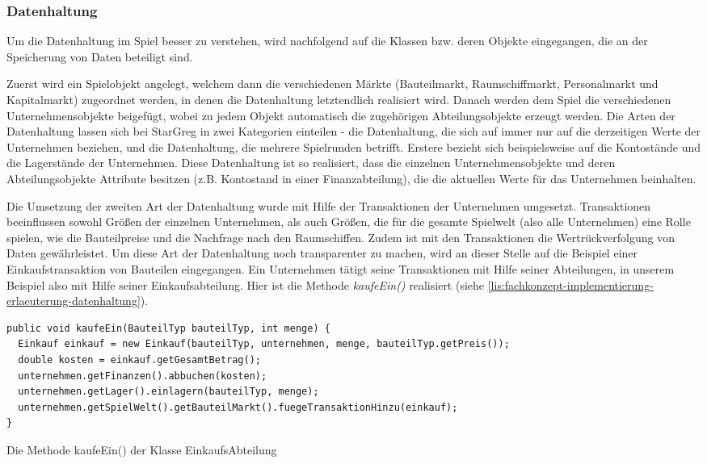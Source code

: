 \subsubsection{Datenhaltung}
\label{subsub:fachkonzept-implementierung-erlaeuterung-datenhaltung}

Um die Datenhaltung im Spiel besser zu verstehen, wird nachfolgend auf die Klassen bzw. deren Objekte eingegangen, die an der Speicherung von Daten beteiligt sind.

Zuerst wird ein Spielobjekt angelegt, welchem dann die verschiedenen Märkte (Bauteilmarkt, Raumschiffmarkt, Personalmarkt und Kapitalmarkt) zugeordnet werden, in denen die Datenhaltung letztendlich realisiert wird. Danach werden dem Spiel die verschiedenen Unternehmensobjekte beigefügt, wobei zu jedem Objekt automatisch die zugehörigen Abteilungsobjekte erzeugt werden. Die Arten der Datenhaltung lassen sich bei StarGreg in zwei Kategorien einteilen - die Datenhaltung, die sich auf immer nur auf die derzeitigen Werte der Unternehmen beziehen, und die Datenhaltung, die mehrere Spielrunden betrifft. Erstere bezieht sich beispielsweise auf die Kontostände und die Lagerstände der Unternehmen. Diese Datenhaltung ist so realisiert, dass die einzelnen Unternehmensobjekte und deren Abteilungsobjekte Attribute besitzen (z.B. Kontostand in einer Finanzabteilung), die die aktuellen Werte für das Unternehmen beinhalten.

Die Umsetzung der zweiten Art der Datenhaltung wurde mit Hilfe der Transaktionen der Unternehmen umgesetzt. Transaktionen beeinflussen sowohl Größen der einzelnen Unternehmen, als auch Größen, die für die gesamte Spielwelt (also alle Unternehmen) eine Rolle spielen, wie die Bauteilpreise und die Nachfrage nach den Raumschiffen. Zudem ist mit den Transaktionen die Wertrückverfolgung von Daten gewährleistet. Um diese Art der Datenhaltung noch transparenter zu machen, wird an dieser Stelle auf die Beispiel einer Einkaufstransaktion von Bauteilen eingegangen. Ein Unternehmen tätigt seine Transaktionen mit Hilfe seiner Abteilungen, in unserem Beispiel also mit Hilfe seiner Einkaufsabteilung. Hier ist die Methode \textit{kaufeEin()} realisiert (siehe \ref{lis:fachkonzept-implementierung-erlaeuterung-datenhaltung}).

\begin{programm}[htbp]
\begin{lstlisting}[breaklines=true]
public void kaufeEin(BauteilTyp bauteilTyp, int menge) {
  Einkauf einkauf = new Einkauf(bauteilTyp, unternehmen, menge, bauteilTyp.getPreis());
  double kosten = einkauf.getGesamtBetrag();
  unternehmen.getFinanzen().abbuchen(kosten);
  unternehmen.getLager().einlagern(bauteilTyp, menge);
  unternehmen.getSpielWelt().getBauteilMarkt().fuegeTransaktionHinzu(einkauf);
}
\end{lstlisting}
\caption{Die Methode kaufeEin() der Klasse EinkaufsAbteilung}
\label{lis:fachkonzept-implementierung-erlaeuterung-datenhaltung}
\end{programm}

